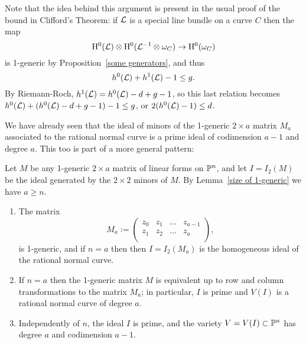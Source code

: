Note that the idea behind this argument is present in the usual proof of the bound in Clifford's Theorem: if $\cL$ is a special
line bundle on a curve $C$ then the map 
$$
\HH^0(\cL) \otimes \HH^0(\cL^{-1}\otimes \omega_C) \to \HH^0 (\omega_C)
$$
is 1-generic by Proposition~\ref{some generators}, and thus
$$
h^0(\cL)+h^1(\cL)-1 \leq g.
$$
By Riemann-Roch,  $h^1(\cL) = h^0(\cL) -d+g-1$, so this last relation becomes
$h^0(\cL)+(h^0(\cL) -d+g-1) -1 \leq g$, or $2(h^0(\cL)-1) \leq d$.




We have already seen that the ideal of minors of the 1-generic $2\times a$ matrix $M_{a}$ associated to the rational normal curve is a prime ideal of codimension $a-1$ and degree $a$. This too is part of a more general pattern:

\begin{theorem}\label{1-generic basics} Let $M$ be any 1-generic $2\times a$ matrix of linear forms on $\PP^n$, and
let $I = I_2(M)$  be the ideal generated by the $2\times 2$ minors of $M$. By Lemma~\ref{size of 1-generic} we have $a\geq n$.
\begin{enumerate}
\item The matrix
$$
M_a:= \begin{pmatrix}
 z_0&z_1&\dots&z_{a-1}\\
 z_1&z_2&\dots&z_{a}\\
\end{pmatrix},
$$
is 1-generic, and if $n=a$ then
then
$I = I_{2}(M_{a})$ is the homogeneous ideal of the rational
normal curve.

\item If $n = a$ then the 1-generic matrix
$M$ is equivalent up to row and column transformations to the matrix $M_{a}$;
in particular, $I$ is prime and $V(I)$ is a rational normal
curve of degree $a$.

\item Independently of $n$, the ideal $I$ is
prime, and the variety $V = V(I) \subset \PP^n$ has degree $a$ and codimension $a-1$.
\end{enumerate}

\end{theorem}

